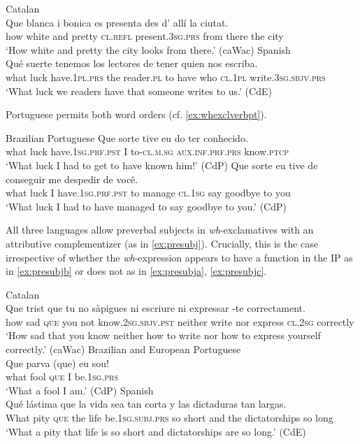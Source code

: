 \ea \label{ex:whexclverb}
\ea
Catalan\\
\gll Que blanca i bonica es presenta {des d'} allí la ciutat. \\
	how white and pretty \textsc{cl.refl} present.\textsc{3sg.prs} from there the city\\
	\glt `How white and pretty the city looks from there.' (caWac)
\ex
		Spanish\\
\gll  Qué suerte tenemos los lectores de tener quien nos escriba. \\
what luck have.\textsc{1pl.prs} the reader.\textsc{pl} to have who \textsc{cl.1pl} write.\textsc{3sg.sbjv.prs}\\
\glt `What  luck we readers have that someone writes to us.' (CdE)
\z 
\z 

Portuguese permits both word orders (cf. \ref{ex:whexclverbpt}).

\ea
\label{ex:whexclverbpt}  Brazilian Portuguese
\ea \gll Que sorte tive eu do ter conhecido. \\
what luck have.\textsc{1sg.prf.pst} I to-\textsc{cl.m.sg} \textsc{aux.inf.prf.prs} know.\textsc{ptcp}\\
\glt `What luck I had to get to have known him!' (CdP)
\ex \gll Que sorte eu tive de conseguir me despedir de você. \\
what luck I have.\textsc{1sg.prf.pst}  to manage \textsc{cl.1sg} {say goodbye} to you\\
\glt `What  luck I had to have managed to say goodbye to you.' (CdP) 
\z
\z


All three languages allow preverbal subjects in \textit{wh}-exclamatives with an attributive complementizer (as in \ref{ex:presubj}). Crucially, this is the case irrespective of whether the \textit{wh}-expression appears to have a function in the IP as in \eqref{ex:presubjb}  or  does not as in \eqref{ex:presubja}, \eqref{ex:presubjc}.

\ea\label{ex:presubj}
\ea\label{ex:presubja}
Catalan\\
\gll  Que trist que tu no sàpigues ni escriure ni expressar -te correctament. \\
how sad \textsc{que} you not  know.\textsc{2sg.sbjv.pst} neither write nor express \textsc{cl.2sg} correctly\\
\glt `How sad that you know neither how to write  nor how to express yourself correctly.' (caWac)
\ex\label{ex:presubjb}
Brazilian and European Portuguese\\ 
\gll Que parva (que) eu sou!  \\
what fool \textsc{que} I be.\textsc{1sg.prs}\\
\glt `What a fool I am.' (CdP)
\ex\label{ex:presubjc}
		Spanish\\
\gll  Qué lástima que la vida sea tan corta y las dictaduras tan largas. \\
What pity \textsc{que} the life be.\textsc{1sg.subj.prs} so short and the dictatorships so long\\
\glt `What a pity that life is so short and dictatorships are so long.' (CdE)
\z
\z




